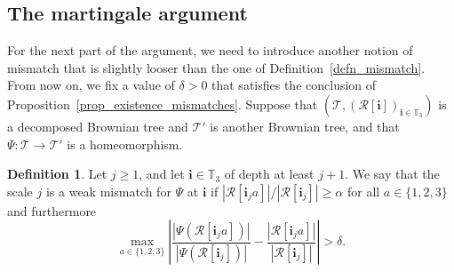 \documentclass[JEP,XML,SOM,Unicode,NoFloatCountersInSection,published]{cedram}
\newcommand{\bsfrac}[2]{{#1}\big/{#2}}
\newcommand{\Tt}{\mathcal{T}}
\newcommand{\Rr}{\mathcal{R}}
\newcommand{\ii}{\mathbf{i}}
\theoremstyle{plain}
\theoremstyle{definition}
\newtheorem{definition}[theorem]{Definition}
\begin{document}
\subsection{The martingale argument}\label{subsec:martingale}
For the next part of the argument, we need to introduce another notion of mismatch that is slightly looser than the one of Definition~\ref{defn_mismatch}.
From now on, we fix a value of $\delta>0$ that satisfies the conclusion of Proposition~\ref{prop_existence_mismatches}.
Suppose that $\left( \Tt, \left( \Rr[\ii] \right)_{\ii \in \mathbb T_3} \right)$ is a decomposed Brownian tree and $\Tt'$ is another Brownian tree, and that $\Psi:\Tt\rightarrow \Tt'$ is a homeomorphism.
\begin{definition}\label{defn:weak_mismatch}
Let $j \geq 1$, and let $\ii \in \mathbb{T}_3$ of depth at least $j+1$. We say that the scale $j$ is a weak mismatch for $\Psi$ at $\ii$ if $\bsfrac{\left| \Rr[\ii_j a] \right|}{\left| \Rr[\ii_j] \right|}\geq \alpha$ for all $a \in \{1,2,3\}$ and furthermore\vspace*{-3pt}
\[ \max_{a\in \{1,2,3\}} \left| \frac{|\Psi(\Rr[\ii_j a])|}{|\Psi(\Rr[\ii_j])|} - \frac{|\Rr[\ii_j a]|}{|\Rr[\ii_j]|} \right| > \delta. \]
\end{definition}
\end{document}
